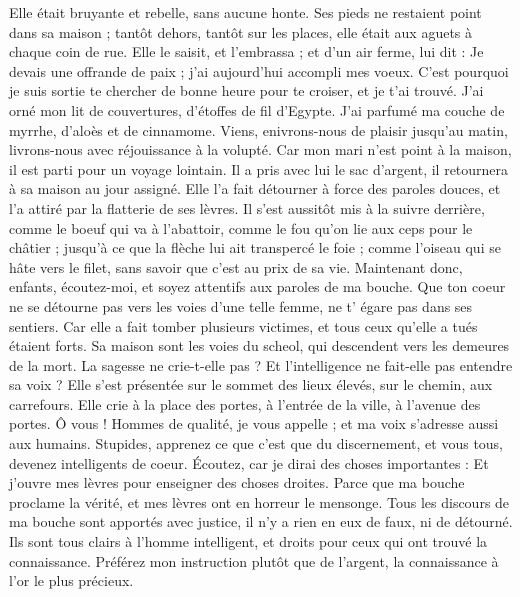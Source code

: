 \begin{multicols}{2}
Elle était bruyante et rebelle, sans aucune honte. Ses pieds ne restaient point dans sa maison ;
tantôt dehors, tantôt sur les places, elle était aux aguets à chaque coin de rue.
Elle le saisit, et l’embrassa ; et d’un air ferme, lui dit :
Je devais une offrande de paix ; j'ai aujourd'hui accompli mes voeux.
C'est pourquoi je suis sortie te chercher de bonne heure pour te croiser, et je t'ai trouvé.
J'ai orné mon lit de couvertures, d’étoffes de fil d'Egypte.
J’ai parfumé ma couche de myrrhe, d'aloès et de cinnamome.
Viens, enivrons-nous de plaisir jusqu'au matin, livrons-nous avec réjouissance à la volupté.
Car mon mari n'est point à la maison, il est parti pour un voyage lointain.
Il a pris avec lui le sac d'argent, il retournera à sa maison au jour assigné.
Elle l'a fait détourner à force des paroles douces, et l'a attiré par la flatterie de ses lèvres.
Il s'est aussitôt mis à la suivre derrière, comme le boeuf qui va à l’abattoir, comme le fou qu’on lie aux ceps pour le châtier ;
jusqu'à ce que la flèche lui ait transpercé le foie ; comme l'oiseau qui se hâte vers le filet, sans savoir que c’est au prix de sa vie.
Maintenant donc, enfants, écoutez-moi, et soyez attentifs aux paroles de ma bouche.
Que ton coeur ne se détourne pas vers les voies d’une telle femme, ne t' égare pas dans ses sentiers.
Car elle a fait tomber plusieurs victimes, et tous ceux qu'elle a tués étaient forts.
Sa maison sont les voies du scheol, qui descendent vers les demeures de la mort.
\TextTitle{[La sagesse]}
\VerseOne{}La sagesse ne crie-t-elle pas ? Et l'intelligence ne fait-elle pas entendre sa voix ?
Elle s'est présentée sur le sommet des lieux élevés, sur le chemin, aux carrefours.
Elle crie à la place des portes, à l'entrée de la ville, à l'avenue des portes.
Ô vous ! Hommes de qualité, je vous appelle ; et ma voix s'adresse aussi aux humains.
Stupides, apprenez ce que c'est que du discernement, et vous tous, devenez intelligents de coeur.
Écoutez, car je dirai des choses importantes : Et j'ouvre mes lèvres pour enseigner des choses droites.
Parce que ma bouche proclame la vérité, et mes lèvres ont en horreur le mensonge.
Tous les discours de ma bouche sont apportés avec justice, il n'y a rien en eux de faux, ni de détourné.
Ils sont tous clairs à l'homme intelligent, et droits pour ceux qui ont trouvé la connaissance.
Préférez mon instruction plutôt que de l'argent, la connaissance à l’or le plus précieux.

\end{multicols}
